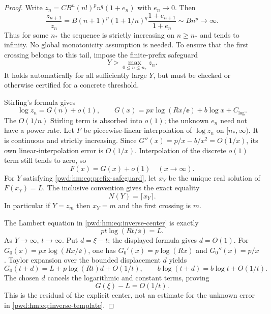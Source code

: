 \documentclass[11pt,letterpaper]{article}
\numberwithin{equation}{section}
\theoremstyle{remark}\newtheorem{remark}[theorem]{Remark}
\begin{document}
\begin{proof}
Write $z_n=CB^n(n!)^pn^q(1+e_n)$ with $e_n\to0$. Then
\[
 \frac{z_{n+1}}{z_n}=B(n+1)^p(1+1/n)^q\frac{1+e_{n+1}}{1+e_n}
 \sim Bn^p\longrightarrow\infty.
\]
Thus for some $n_*$ the sequence is strictly increasing on $n\ge n_*$ and tends to infinity. No global monotonicity assumption is needed. To ensure that the first crossing belongs to this tail, impose the finite-prefix safeguard
\begin{equation}\label{pwd:hm:eq:prefix-safeguard}
 Y>\max_{0\le n\le n_*}z_n.
\end{equation}
It holds automatically for all sufficiently large $Y$, but must be checked or otherwise certified for a concrete threshold.

Stirling's formula gives
\begin{equation}\label{pwd:hm:eq:G}
 \log z_n=G(n)+o(1),\qquad
 G(x)=px\log(Rx/\ee)+b\log x+C_{\log}.
\end{equation}
The $O(1/n)$ Stirling term is absorbed into $o(1)$; the unknown $e_n$ need not have a power rate. Let $F$ be piecewise-linear interpolation of $\log z_n$ on $[n_*,\infty)$. It is continuous and strictly increasing. Since
$G''(x)=p/x-b/x^2=O(1/x)$, its own linear-interpolation error is $O(1/x)$. Interpolation of the discrete $o(1)$ term still tends to zero, so
\begin{equation}\label{pwd:hm:eq:interpolation}
 F(x)=G(x)+o(1)\quad(x\to\infty).
\end{equation}
For $Y$ satisfying \eqref{pwd:hm:eq:prefix-safeguard}, let $x_Y$ be the unique real solution of $F(x_Y)=L$. The inclusive convention gives the exact equality
\begin{equation}\label{pwd:hm:eq:exact-ceiling}
 N(Y)=\lceil x_Y\rceil.
\end{equation}
In particular if $Y=z_m$ then $x_Y=m$ and the first crossing is $m$.

The Lambert equation in \eqref{pwd:hm:eq:inverse-center} is exactly
\begin{equation}\label{pwd:hm:eq:t-L}
 pt\log(Rt/\ee)=L.
\end{equation}
As $Y\to\infty$, $t\to\infty$. Put $d=\xi-t$; the displayed formula gives $d=O(1)$. For $G_0(x)=px\log(Rx/\ee)$, one has $G_0'(x)=p\log(Rx)$ and $G_0''(x)=p/x$. Taylor expansion over the bounded displacement $d$ yields
\[
 G_0(t+d)=L+p\log(Rt)d+O(1/t),\qquad
 b\log(t+d)=b\log t+O(1/t).
\]
The chosen $d$ cancels the logarithmic and constant terms, proving
\begin{equation}\label{pwd:hm:eq:center-residual}
 G(\xi)-L=O(1/t).
\end{equation}
This is the residual of the explicit center, not an estimate for the unknown error in \eqref{pwd:hm:eq:inverse-template}.


\end{proof}
\end{document}
